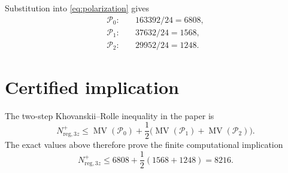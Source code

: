 \documentclass[11pt]{article}
\newcommand{\MV}{\operatorname{MV}}
\begin{document}
Substitution into \eqref{eq:polarization} gives
\begin{align*}
 \mathcal P_0:&\quad 163392/24=6808,\\
 \mathcal P_1:&\quad 37632/24=1568,\\
 \mathcal P_2:&\quad 29952/24=1248.
\end{align*}

\section{Certified implication}

The two-step Khovanskii--Rolle inequality in the paper is
\[
 N_{\mathrm{reg},3z}^{+}
 \le \MV(\mathcal P_0)
 +\frac12\bigl(\MV(\mathcal P_1)+\MV(\mathcal P_2)\bigr).
\]
The exact values above therefore prove the finite computational implication
\[
 \boxed{N_{\mathrm{reg},3z}^{+}\le
 6808+\frac12(1568+1248)=8216}.
\]
\end{document}
